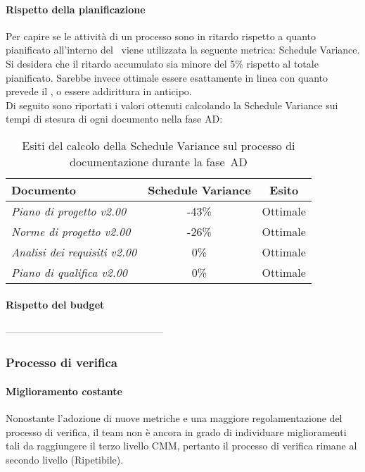 \documentclass[../PianoDiQualifica.tex]{subfiles}
\begin{document}
\begin{appendices}
			\paragraph{Rispetto della pianificazione}
			Per capire se le attività di un processo sono in ritardo rispetto a quanto pianificato all’interno del \pianodiprogetto\ viene utilizzata la seguente metrica: Schedule Variance.\\
			Si desidera che il ritardo accumulato sia minore del 5\% rispetto al totale pianificato. Sarebbe invece ottimale essere esattamente in linea con quanto prevede il \pianodiprogetto, o essere addirittura in anticipo.\\
			Di seguito sono riportati i valori ottenuti calcolando la Schedule Variance sui tempi di stesura di ogni documento nella fase AD:
			\begin{table}[H]
				\centering
				\begin{tabular}{l * {2}{c}}
					\toprule
					\textbf{Documento} & \textbf{Schedule Variance} & \textbf{Esito} \\
					\midrule
					\textit{Piano di progetto v2.00} & -43\% &  Ottimale \\
					\textit{Norme di progetto v2.00} & -26\% & Ottimale \\
					\textit{Analisi dei requisiti v2.00} & 0\% & Ottimale \\
					\textit{Piano di qualifica v2.00} & 0\% & Ottimale \\
					\bottomrule
				\end{tabular}
				\caption{Esiti del calcolo della Schedule Variance sul processo di documentazione durante la fase\g\ AD}
				\label{tab:esiti_schedule_variance}
			\end{table}
			
			\paragraph{Rispetto del budget}
			------------------------------------------------
			
		\subsubsection{Processo di verifica}
			\paragraph{Miglioramento costante}
			Nonostante l'adozione di nuove metriche e una maggiore regolamentazione del processo di verifica, il team non è ancora in grado di individuare miglioramenti tali da raggiungere il terzo livello CMM, pertanto il processo di verifica rimane al secondo livello (Ripetibile).
			

\end{appendices}
\end{document}
